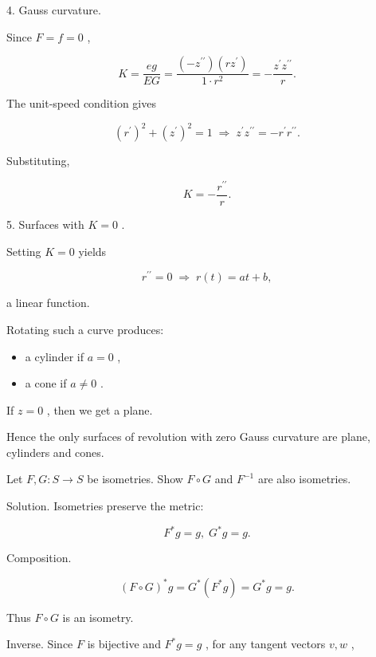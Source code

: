 \documentclass[10pt]{article}
\begin{document}
4. Gauss curvature.

Since \(F = f = 0\) ,

\[
K = \frac{eg}{EG} = \frac{\left( {-{z}^{\prime \prime }}\right) \left( {r{z}^{\prime }}\right) }{1 \cdot  {r}^{2}} =  - \frac{{z}^{\prime }{z}^{\prime \prime }}{r}.
\]

The unit-speed condition gives

\[
{\left( {r}^{\prime }\right) }^{2} + {\left( {z}^{\prime }\right) }^{2} = 1\; \Rightarrow  \;{z}^{\prime }{z}^{\prime \prime } =  - {r}^{\prime }{r}^{\prime \prime }.
\]

Substituting,

\[
K =  - \frac{{r}^{\prime \prime }}{r}.
\]

5. Surfaces with \(K = 0\) .

Setting \(K = 0\) yields

\[
{r}^{\prime \prime } = 0\; \Rightarrow  \;r\left( t\right)  = {at} + b,
\]

a linear function.

Rotating such a curve produces:

\begin{itemize}\relax
\item\relax a cylinder if \(a = 0\) ,
\end{itemize}

\begin{itemize}\relax
\item\relax a cone if \(a \neq  0\) .
\end{itemize}

If \(z = 0\) , then we get a plane.

Hence the only surfaces of revolution with zero Gauss curvature are plane, cylinders and cones.

\begin{problem}[title=PROBLEM 5 (5 POINTS)]
Let \(F,G : S \rightarrow  S\) be isometries. Show \(F \circ  G\) and \({F}^{-1}\) are also isometries.
\end{problem}

Solution. Isometries preserve the metric:

\[
{F}^{ * }g = g,\;{G}^{ * }g = g.
\]

Composition.

\[
{\left( F \circ  G\right) }^{ * }g = {G}^{ * }\left( {{F}^{ * }g}\right)  = {G}^{ * }g = g.
\]

Thus \(F \circ  G\) is an isometry.

Inverse. Since \(F\) is bijective and \({F}^{ * }g = g\) , for any tangent vectors \(v,w\) ,
\end{document}
